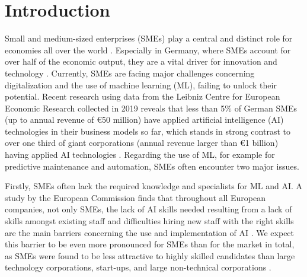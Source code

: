 \section{Introduction\label{sec:introduction}}
Small and medium-sized enterprises (SMEs) play a central and distinct role for economies all over the world \citep{lukacs2005economic}.
%
Especially in Germany, where SMEs account for over half of the economic output, they are a vital driver for innovation and technology \citep{bmwi2020mittelstand}.
%
Currently, SMEs are facing major challenges concerning digitalization and the use of machine learning (ML), failing to unlock their potential.
%
Recent research using data from the Leibniz Centre for European Economic Research collected in 2019 reveals that less than 5\% of German SMEs (up to annual revenue of \euro 50 million) have applied artificial intelligence (AI) technologies in their business models so far, which stands in strong contrast to over one third of giant corporations (annual revenue larger than \euro 1 billion) having applied AI technologies \citep{hbr2021midsizeAI}.
%
Regarding the use of ML, for example for predictive maintenance and automation, SMEs often encounter two major issues.

Firstly, SMEs often lack the required knowledge and specialists for ML and AI.
A study by the European Commission finds that throughout all European companies, not only SMEs, the lack of AI skills needed resulting from a lack of skills amongst existing staff and difficulties hiring new staff with the right skills are the main barriers concerning the use and implementation of AI \citep{europeancommission2020AI}. We expect this barrier to be even more pronounced for SMEs than for the market in total, as SMEs were found to be less attractive to highly skilled candidates than large technology corporations, start-ups, and large non-technical corporations \citep{hbr2021midsizeAI}.

